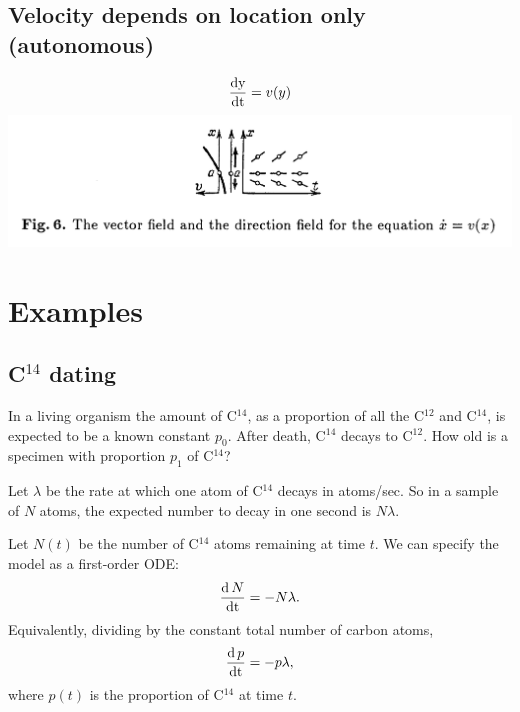 \subsection{Velocity depends on location only (autonomous)}
\begin{align*}
  \frac{\operatorname{\text{dy}}}{\operatorname{\text{dt}}} = v(y)
\end{align*}
\includegraphics[width=400pt]{img/differential-equations-2-direction-field.png}\\



\section{Examples}
\subsection{C$^{14}$ dating}
\begin{mdframed}
  In a living organism the amount of C$^{14}$, as a proportion of all the
  C$^{12}$ and C$^{14}$, is expected to be a known constant $p_0$. After death,
  C$^{14}$ decays to C$^{12}$. How old is a specimen with proportion $p_1$ of
  C$^{14}$?
\end{mdframed}
Let $\lambda$ be the rate at which one atom of C$^{14}$ decays in atoms/sec. So
in a sample of $N$ atoms, the expected number to decay in one second is
$N\lambda$.

Let $N(t)$ be the number of C$^{14}$ atoms remaining at time $t$. We can
specify the model as a first-order ODE:
\begin{align*}
\frac{\operatorname{\text{d}} N}{\operatorname{\text{dt}}} = -N\lambda.
\end{align*}
Equivalently, dividing by the constant total number of carbon atoms,
\begin{align*}
\frac{\operatorname{\text{d}} p}{\operatorname{\text{dt}}} = -p\lambda,
\end{align*}
where $p(t)$ is the proportion of C$^{14}$ at time $t$.


